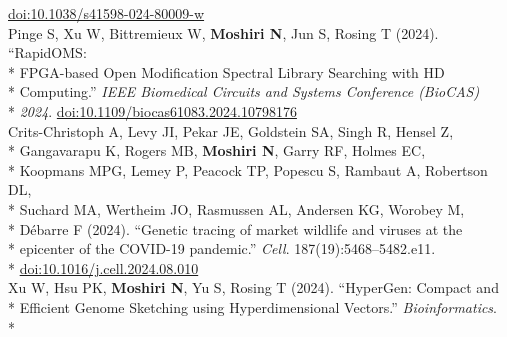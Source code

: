 \documentclass[margin,line]{res}
\begin{document}
\begin{resume}
\hspace*{8mm} \href{https://doi.org/10.1038/s41598-024-80009-w}{doi:10.1038/s41598-024-80009-w}\\
\hspace*{4mm} Pinge S, Xu W, Bittremieux W, \textbf{Moshiri N}, Jun S, Rosing T (2024). ``RapidOMS:\\*
\hspace*{9mm} FPGA-based Open Modification Spectral Library Searching with HD\\*
\hspace*{9mm} Computing.'' \textit{IEEE Biomedical Circuits and Systems Conference (BioCAS)}\\*\vspace{2mm}
\hspace*{8mm} \textit{2024}. \href{http://doi.org/10.1109/biocas61083.2024.10798176}{doi:10.1109/biocas61083.2024.10798176}\\
\hspace*{4mm} Crits-Christoph A, Levy JI, Pekar JE, Goldstein SA, Singh R, Hensel Z,\\*
\hspace*{9mm} Gangavarapu K, Rogers MB, \textbf{Moshiri N}, Garry RF, Holmes EC,\\*
\hspace*{9mm} Koopmans MPG, Lemey P, Peacock TP, Popescu S, Rambaut A, Robertson DL,\\*
\hspace*{9mm} Suchard MA, Wertheim JO, Rasmussen AL, Andersen KG, Worobey M,\\*
\hspace*{9mm} D\'{e}barre F (2024). ``Genetic tracing of market wildlife and viruses at the\\*
\hspace*{9mm} epicenter of the COVID-19 pandemic.'' \textit{Cell}. 187(19):5468--5482.e11.\\*\vspace{2mm}
\hspace*{8mm} \href{https://doi.org/10.1016/j.cell.2024.08.010}{doi:10.1016/j.cell.2024.08.010}\\
\hspace*{4mm} Xu W, Hsu PK, \textbf{Moshiri N}, Yu S, Rosing T (2024). ``HyperGen: Compact and\\*
\hspace*{9mm} Efficient Genome Sketching using Hyperdimensional Vectors.'' \textit{Bioinformatics}.\\*\vspace{2mm}

\end{resume}
\end{document}
